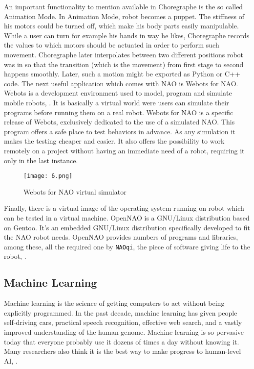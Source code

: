          An important functionality to mention available in Choregraphe is the so called Animation Mode. In Animation Mode, robot becomes a puppet. The stiffness of his motors could be turned off, which make his body parts easily manipulable. While a user can turn for example his hands in way he likes, Choregraphe records the values to which motors should be actuated in order to perform such movement. Choregraphe later interpolates between two different positions robot was in so that the transition (which is the movement) from first stage to second happens smoothly. Later, such a motion might be exported as Python or C++ code.
        The next useful application which comes with NAO is Webots for NAO. Webots is a development environment used to model, program and simulate mobile robots, \cite{webots}. It is basically a virtual world were users can simulate their programs before running them on a real robot. Webots for NAO is a specific release of Webots, exclusively dedicated to the use of a simulated NAO. This program offers a safe place to test behaviors in advance. As any simulation it makes the testing cheaper and easier. It also offers the possibility to work remotely on a project without having an immediate need of a robot, requiring it only in the last instance.
        \begin{figure}[b!]
             \texttt{[image: 6.png]} 
            \centering
            \caption{Webots for NAO virtual simulator}
            \label{webots}
        \end{figure}
        Finally, there is a virtual image of the operating system running on robot which can be tested in a virtual machine. OpenNAO is a GNU/Linux distribution based on Gentoo. It’s an embedded GNU/Linux distribution specifically developed to fit the NAO robot needs. OpenNAO provides numbers of programs and libraries, among these, all the required one by \verb|NAOqi|, the piece of software giving life to the robot, \cite{naoDocumentation}.    

\subsection{Machine Learning}

    Machine learning is the science of getting computers to act without being explicitly programmed. In the past decade, machine learning has given people self-driving cars, practical speech recognition, effective web search, and a vastly improved understanding of the human genome. Machine learning is so pervasive today that everyone probably use it dozens of times a day without knowing it. Many researchers also think it is the best way to make progress to human-level AI, \cite{ml}.

